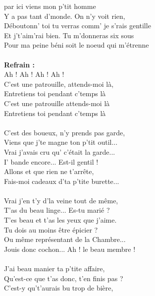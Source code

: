
 par ici viens mon p'tit homme
\\Y a pas tant d'monde. On n'y voit rien,
\\Déboutonn' toi tu verras comm' je s'rais gentille
\\Et j't'aim'rai bien. Tu m'donneras six sous
\\Pour ma peine béni soit le noeud qui m'étrenne
\\\\\textbf{Refrain :}
\\Ah ! Ah ! Ah ! Ah !
\\C'est une patrouille, attends-moi là,
\\Entretiens toi pendant c'temps là
\\C'est une patrouille attends-moi là
\\Entretiens toi pendant c'temps là
\\\\C'est des boueux, n'y prends pas garde,
\\Viens que j'te magne ton p'tit outil...
\\Vrai j'avais cru qu' c'était la garde...
\\I' bande encore... Est-il gentil !
\\Allons et que rien ne t'arrête,
\\Fais-moi cadeaux d'ta p'tite burette...
\\\\Vrai j'en t'y d'la veine tout de même,
\\T'as du beau linge... Es-tu marié ?
\\T'es beau et t'as les yeux que j'aime.
\\Tu dois au moins être épicier ?
\\Ou même représentant de la Chambre...
\\Jouis donc cochon... Ah ! le beau membre !
\\\\J'ai beau manier ta p'tite affaire,
\\Qu'est-ce que t'as donc, t'en finis pas ?
\\C'est-y qu't'aurais bu trop de bière,
